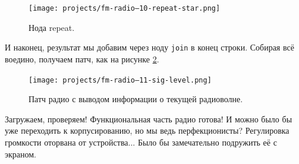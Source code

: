 \begin{figure}
  \centering
  \texttt{[image: projects/fm-radio--10-repeat-star.png]}
  \caption{Нода repeat.}
  \label{patch:node-repeat}
\end{figure}

И наконец, результат мы добавим через ноду \texttt{join} в конец строки. Собирая всё воедино, получаем патч, как на рисунке \ref{patch:fm-lcd-line-1}.

\begin{figure}
  \centering
  \texttt{[image: projects/fm-radio--11-sig-level.png]}
  \caption{Патч радио с выводом информации о текущей радиоволне.}
  \label{patch:fm-lcd-line-1}
\end{figure}

Загружаем, проверяем! Функциональная часть радио готова! И можно было бы уже переходить к корпусированию, но мы ведь перфекционисты? Регулировка громкости оторвана от устройства... Было бы замечательно подружить её с экраном.

